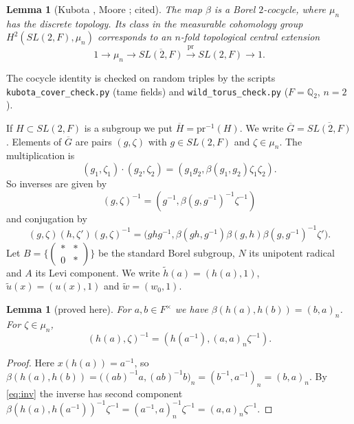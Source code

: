 \documentclass[12pt,letterpaper]{article}
\numberwithin{equation}{section}
\newtheorem{lemma}[theorem]{Lemma}
\theoremstyle{definition}
\newcommand{\proved}{proved here}
\newcommand{\cited}{cited}
\newcommand{\Q}{\mathbb Q}
\newcommand{\bG}{\overline{G}}
\newcommand{\wt}{\tilde w}
\newcommand{\hl}{\tilde h}
\newcommand{\ul}{\tilde u}
\newcommand{\pr}{\mathrm{pr}}
\begin{document}
\begin{lemma}[Kubota \cite{Ku67}, Moore \cite{Mo68}; \cited]\label{lem:kubota}
The map $\beta$ is a Borel $2$-cocycle, where $\mu_n$ has the discrete topology.  Its class in
the measurable cohomology group $H^2(SL(2,F),\mu_n)$ corresponds to an $n$-fold topological
central extension
\[
1\longrightarrow\mu_n\longrightarrow\overline{SL(2,F)}\xrightarrow{\ \pr\ }SL(2,F)\longrightarrow1 .
\]
\end{lemma}
The cocycle identity is checked on random triples by the scripts
\texttt{kubota\_cover\_check.py} (tame fields) and \texttt{wild\_torus\_check.py}
($F=\Q_2$, $n=2$).

If $H\subset SL(2,F)$ is a subgroup we put $\overline H=\pr^{-1}(H)$.  We write
$\bG=\overline{SL(2,F)}$.  Elements of $\bG$ are pairs $(g,\zeta)$ with $g\in SL(2,F)$ and
$\zeta\in\mu_n$.  The multiplication is
\begin{equation}\label{eq:mult}
(g_1,\zeta_1)\cdot(g_2,\zeta_2)=(g_1g_2,\beta(g_1,g_2)\zeta_1\zeta_2).
\end{equation}
So inverses are given by
\begin{equation}\label{eq:inv}
(g,\zeta)^{-1}=(g^{-1},\beta(g,g^{-1})^{-1}\zeta^{-1})
\end{equation}
and conjugation by
\begin{equation}\label{eq:conj}
(g,\zeta)(h,\zeta')(g,\zeta)^{-1}=\bigl(ghg^{-1},\beta(gh,g^{-1})\beta(g,h)\beta(g,g^{-1})^{-1}\zeta'\bigr).
\end{equation}
Let $B=\{\begin{pmatrix}*&*\\0&*\end{pmatrix}\}$ be the standard Borel subgroup, $N$ its
unipotent radical and $A$ its Levi component.  We write $\hl(a)=(h(a),1)$,
$\ul(x)=(u(x),1)$ and $\wt=(w_0,1)$.

\begin{lemma}[\proved]\label{lem:inverse}
For $a,b\in F^\times$ we have $\beta(h(a),h(b))=(b,a)_n$.  For $\zeta\in\mu_n$,
\[
(h(a),\zeta)^{-1}=(h(a^{-1}),(a,a)_n\zeta^{-1}).
\]
\end{lemma}
\begin{proof}
Here $x(h(a))=a^{-1}$, so
$\beta(h(a),h(b))=\bigl((ab)^{-1}a,(ab)^{-1}b\bigr)_n=(b^{-1},a^{-1})_n=(b,a)_n$.  By
\eqref{eq:inv} the inverse has second component
$\beta(h(a),h(a^{-1}))^{-1}\zeta^{-1}=(a^{-1},a)_n^{-1}\zeta^{-1}=(a,a)_n\zeta^{-1}$.
\end{proof}
\end{document}
